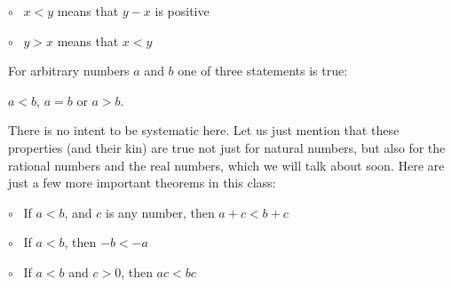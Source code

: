 \documentclass[11pt, oneside]{article}
\begin{document}
$\circ$ \ $x < y$ means that $y - x$ is positive

$\circ$ \ $y > x$ means that $x < y$

For arbitrary numbers $a$ and $b$ one of three statements is true:  

$a < b$, $a = b$ or $a > b$.

There is no intent to be systematic here.  Let us just mention that these properties (and their kin) are true not just for natural numbers, but also for the rational numbers and the real numbers, which we will talk about soon.  Here are just a few more important theorems in this class:

$\circ$ \ If $a < b$, and $c$ is any number, then $a + c < b + c$

$\circ$ \ If $a < b$, then $-b < -a$

$\circ$ \ If $a < b$ and $c > 0$, then $ac < bc$
\end{document}
